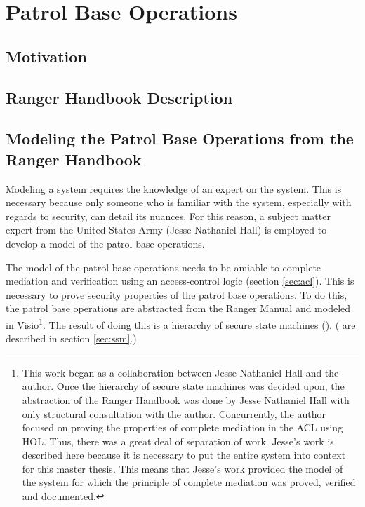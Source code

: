 \documentclass[../../main/main.tex]{subfiles}
\begin{document}
\chapter{Patrol Base Operations}\label{chp:pb}
\section{Motivation}

\section{Ranger Handbook Description}

\section{Modeling the Patrol Base Operations from the Ranger Handbook}\label{sec:modelingpb}
\glsresetall[\acronymtype]

Modeling a system requires the knowledge of an expert on the system.  This is necessary because only someone who is familiar with the system, especially with regards to security, can detail its nuances.  For this reason, a subject matter expert from the United States Army (Jesse Nathaniel Hall) is employed to develop a model of the patrol base operations. 

The model of the patrol base operations needs to be amiable to complete mediation and verification using an access-control logic (section \ref{sec:acl}).  This is necessary to prove security properties of the patrol base operations.  To do this, the patrol base operations are abstracted from the Ranger Manual and modeled in Visio\footnote{This work began as a collaboration between Jesse Nathaniel Hall and the author.  Once the hierarchy of secure state machines was decided upon, the abstraction of the Ranger Handbook was done by Jesse Nathaniel Hall with only structural consultation with the author.  Concurrently, the author focused on proving the properties of complete mediation in the ACL using HOL.  Thus, there was a great deal of separation of work.  Jesse's work is described here because it is necessary to put the entire system into context for this master thesis.  This means that Jesse's work provided the model of the system for which the principle of complete mediation was proved, verified and documented.}.  The result of doing this is a hierarchy of secure state machines (). ( are described in section \ref{sec:ssm}.)  
\end{document}
